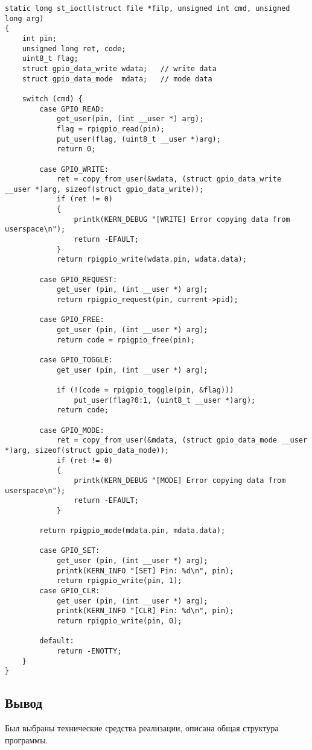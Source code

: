 \begin{lstlisting}[caption = {Функция ввода/вывода}, label=lst:iofunc]
static long st_ioctl(struct file *filp, unsigned int cmd, unsigned long arg)
{
	int pin;
	unsigned long ret, code;
	uint8_t flag;
	struct gpio_data_write wdata;	// write data
	struct gpio_data_mode  mdata;	// mode data
	
	switch (cmd) {
		case GPIO_READ:
			get_user(pin, (int __user *) arg);
			flag = rpigpio_read(pin);
			put_user(flag, (uint8_t __user *)arg);
			return 0;
		
		case GPIO_WRITE:
			ret = copy_from_user(&wdata, (struct gpio_data_write __user *)arg, sizeof(struct gpio_data_write));
			if (ret != 0) 
			{
				printk(KERN_DEBUG "[WRITE] Error copying data from userspace\n");
				return -EFAULT;
			}
			return rpigpio_write(wdata.pin, wdata.data);
			
		case GPIO_REQUEST:
			get_user (pin, (int __user *) arg);
			return rpigpio_request(pin, current->pid);
		
		case GPIO_FREE:
			get_user (pin, (int __user *) arg);
			return code = rpigpio_free(pin);
		
		case GPIO_TOGGLE:
			get_user (pin, (int __user *) arg);
			
			if (!(code = rpigpio_toggle(pin, &flag)))
				put_user(flag?0:1, (uint8_t __user *)arg);
			return code;
		
		case GPIO_MODE:
			ret = copy_from_user(&mdata, (struct gpio_data_mode __user *)arg, sizeof(struct gpio_data_mode));
			if (ret != 0) 
			{
				printk(KERN_DEBUG "[MODE] Error copying data from userspace\n");
				return -EFAULT;
			}
		
		return rpigpio_mode(mdata.pin, mdata.data);
		
		case GPIO_SET:
			get_user (pin, (int __user *) arg);
			printk(KERN_INFO "[SET] Pin: %d\n", pin);
			return rpigpio_write(pin, 1);
		case GPIO_CLR:
			get_user (pin, (int __user *) arg);
			printk(KERN_INFO "[CLR] Pin: %d\n", pin);
			return rpigpio_write(pin, 0);
		
		default:
			return -ENOTTY;
	}
}
\end{lstlisting}

\subsection*{Вывод}
	Был выбраны технические средства реализации, описана общая структура программы. 

\pagebreak